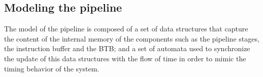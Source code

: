 


  \subsection{Modeling the pipeline}
  \label{sec:model:pipeline}

  The model of the pipeline is composed of a set of data structures that capture the content of the internal memory of the components such as the pipeline stages, the instruction buffer and the BTB; and a set of automata used to synchronize the update of this data structures with the flow of time in order to mimic the timing behavior of the system.


